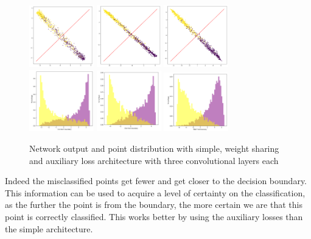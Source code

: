 \documentclass{article}
\begin{document}
\begin{figure}[H]
\begin{center}
\includegraphics[width=0.25\textwidth]{simple_conv3}
\includegraphics[width=0.25\textwidth]{ws_conv3}
\includegraphics[width=0.25\textwidth]{al_conv3}
\includegraphics[width=0.25\textwidth]{pdf_simple}
\includegraphics[width=0.25\textwidth]{pdf_ws}
\includegraphics[width=0.25\textwidth]{pdf_al}
\caption{Network output and point distribution with simple, weight sharing and auxiliary loss architecture with three convolutional layers each}
\end{center}
\end{figure}

Indeed the misclassified points get fewer and get closer to the decision boundary. This information can be used to acquire a level of certainty on the classification, as the further the point is from the boundary, the more certain we are that this point is correctly classified. This works better by using the auxiliary losses than the simple architecture. 
\end{document}
